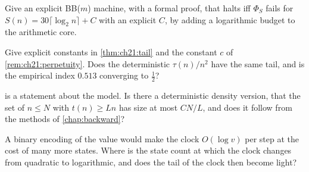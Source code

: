 \begin{problem*}\label{prob:ch21:halting}
Give an explicit BB($m$) machine, with a formal proof, that halts iff $\Phi_S$ fails for $S(n)=30\lceil\log_2n\rceil+C$ with an explicit $C$, by adding a logarithmic budget to the arithmetic core.
\end{problem*}

\begin{problem*}\label{prob:ch21:clock}
Give explicit constants in \cref{thm:ch21:tail} and the constant $c$ of \cref{rem:ch21:perpetuity}. Does the deterministic $\tau(n)/n^2$ have the same tail, and is the empirical index $0.513$ converging to $\tfrac12$?
\end{problem*}

\begin{problem*}\label{prob:ch21:excursions}
 is a statement about the model. Is there a deterministic density version, that the set of $n\le N$ with $t(n)\ge Ln$ has size at most $CN/L$, and does it follow from the methods of \cref{chap:backward}?
\end{problem*}

\begin{problem*}\label{prob:ch21:binary}
A binary encoding of the value would make the clock $O(\log v)$ per step at the cost of many more states. Where is the state count at which the clock changes from quadratic to logarithmic, and does the tail of the clock then become light?
\end{problem*}
